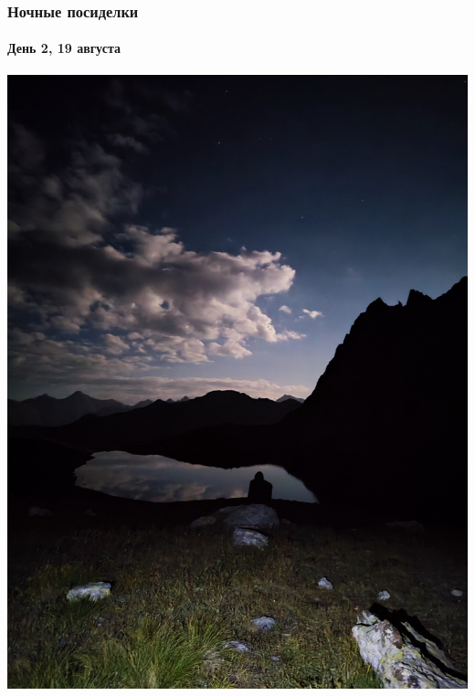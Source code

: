 \begin{frame}
	\frametitle{Ночные посиделки}
	\framesubtitle{День 2, 19 августа}
	{\tiny
		\begin{minipage}{\fourpicsize}
			\centering
			\includegraphics[width=\textwidth]{../pics/IMG_20240819_204902}			
		\end{minipage}
		\hfill
		\begin{minipage}{\fourpicsize}
			\centering

\end{minipage}}
\end{frame}
